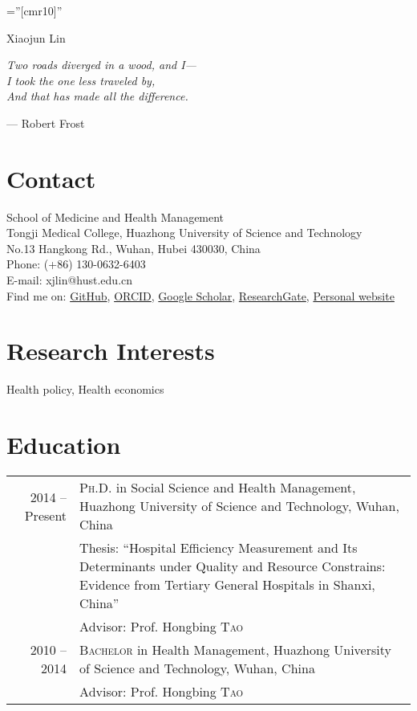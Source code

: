 \documentclass[a4paper,10pt]{article}
\begin{document}
\pagestyle{plain} %

\font\fb=''[cmr10]'' %

\par{\centering
		{\Huge Xiaojun Lin
	}\bigskip\par}
	
\setlength{\epigraphwidth}{0.4\textwidth}
\epigraph {\textit{Two roads diverged in a wood, and I—  \\
I took the one less traveled by,\\
And that has made all the difference.}}{--- Robert Frost}




\section{Contact}
School of Medicine and Health Management\\
Tongji Medical College, Huazhong University of Science and Technology\\
No.13 Hangkong Rd., Wuhan, Hubei 430030, China\\[.4cm]
Phone: (+86) 130-0632-6403\\
E-mail: xjlin@hust.edu.cn\\
Find me on: 
\href{https://github.com/xiaojunlin}{GitHub},
\href{https://orcid.org/0000-0003-4284-2401}{ORCID}, \href{https://scholar.google.com/citations?user=ZBGYTowAAAAJ&hl=zh-CN}{Google Scholar}, \href{https://www.researchgate.net/profile/Xiaojun_Lin2}{ResearchGate}, \href{https://xiaojunlin.github.io}{Personal website}

\section{Research Interests}
Health policy, Health economics

\section{Education}
\begin{tabular}{r p{11cm}}
 2014 -- Present & \textsc{Ph.D.} in Social Science and Health Management, Huazhong University of Science and Technology, Wuhan, China \\
& Thesis: ``Hospital Efficiency Measurement and Its Determinants under Quality and Resource Constrains: Evidence from Tertiary General Hospitals in Shanxi, China''\\
& \small Advisor: Prof. Hongbing \textsc{Tao}\\
 2010 -- 2014 & \textsc{Bachelor} in Health Management, Huazhong University of Science and Technology, Wuhan, China\\
& \small Advisor: Prof. Hongbing \textsc{Tao}\\
\end{tabular}
\end{document}
